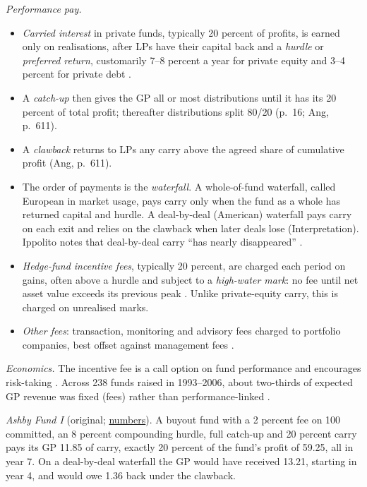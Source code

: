 \begin{qfdefinition}
\emph{Performance pay.}
\begin{itemize}
\item \emph{Carried interest} in private funds, typically 20 percent of profits, is earned only on realisations, after LPs have their capital back and a \emph{hurdle} or \emph{preferred return}, customarily 7--8 percent a year for private equity and 3--4 percent for private debt \citep[p.~16]{ippolito-private-capital-2020}.
\item A \emph{catch-up} then gives the GP all or most distributions until it has its 20 percent of total profit; thereafter distributions split 80/20 (p.~16; Ang, p.~611).
\item A \emph{clawback} returns to LPs any carry above the agreed share of cumulative profit (Ang, p.~611).
\item The order of payments is the \emph{waterfall}. A whole-of-fund waterfall, called European in market usage, pays carry only when the fund as a whole has returned capital and hurdle. A deal-by-deal (American) waterfall pays carry on each exit and relies on the clawback when later deals lose (Interpretation). Ippolito notes that deal-by-deal carry ``has nearly disappeared'' \citep[p.~16]{ippolito-private-capital-2020}.
\item \emph{Hedge-fund incentive fees}, typically 20 percent, are charged each period on gains, often above a hurdle and subject to a \emph{high-water mark}: no fee until net asset value exceeds its previous peak \citep[pp.~581--582]{s7-ang}. Unlike private-equity carry, this is charged on unrealised marks.
\item \emph{Other fees}: transaction, monitoring and advisory fees charged to portfolio companies, best offset against management fees \citep[pp.~611--612]{s7-ang}.
\end{itemize}

\emph{Economics.} The incentive fee is a call option on fund performance and encourages risk-taking \citep[pp.~584--585]{s7-ang}. Across 238 funds raised in 1993--2006, about two-thirds of expected GP revenue was fixed (fees) rather than performance-linked \citep[p.~35]{metrick-yasuda-survey-2011}.

 \emph{Ashby Fund I} (original; \hyperref[meth:gp-alignment-net-returns]{numbers}). A buyout fund with a 2 percent fee on 100 committed, an 8 percent compounding hurdle, full catch-up and 20 percent carry pays its GP 11.85 of carry, exactly 20 percent of the fund's profit of 59.25, all in year 7. On a deal-by-deal waterfall the GP would have received 13.21, starting in year 4, and would owe 1.36 back under the clawback.


\end{qfdefinition}
